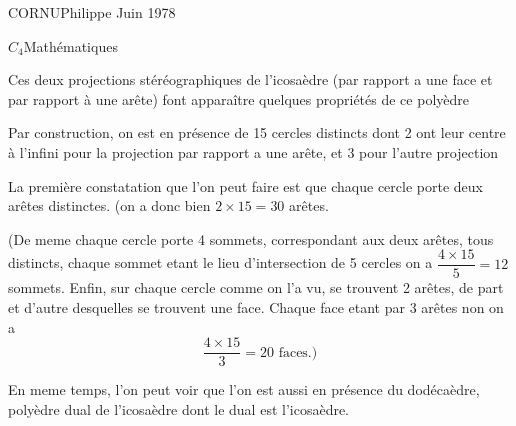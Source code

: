 
CORNU\qquad Philippe Juin 1978

$C_4$\quad Mathématiques


Ces deux projections stéréographiques de l'icosaèdre (par rapport a une face et par rapport à une arête) font apparaître quelques propriétés  de ce polyèdre

Par construction, on est en présence de 15 cercles distincts dont 2 ont leur centre à l'infini pour la projection par rapport a une arête, et 3 pour l'autre projection

La première constatation que l'on peut faire est que chaque cercle porte deux arêtes distinctes. (on a donc bien $2\times15=30$ arêtes.

(De meme chaque cercle porte 4 sommets, correspondant aux deux arêtes, tous distincts, chaque sommet etant le lieu d'intersection de 5 cercles on a $\dfrac{4\times15}{5}=12$ sommets. Enfin, sur chaque cercle comme on l'a vu, se trouvent 2 arêtes, de part et d'autre desquelles se trouvent une face. Chaque face etant  par 3 arêtes non  on a
\[
\frac{4\times15}{3}=20\text{ faces.})
\]

En meme temps, l'on peut voir que l'on est aussi en présence du dodécaèdre, polyèdre dual de l'icosaèdre dont le dual est l'icosaèdre.

